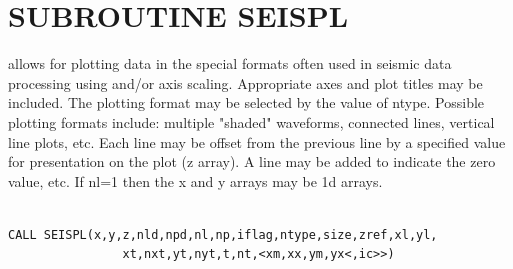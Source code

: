 \documentclass[11pt]{report}
\begin{document}
\section{SUBROUTINE SEISPL}
 allows for plotting data in the special formats often used in seismic
data processing using  and/or  axis scaling.  Appropriate
axes and plot titles may be included.  The plotting format may be
selected by the value of ntype.   Possible plotting formats include:
multiple "shaded" waveforms, connected lines, vertical line plots, etc.
Each line may be offset from the previous line by a specified value for
presentation on the plot (z array).  A line may be added to indicate
the zero value, etc.  If nl=1 then the x and y arrays 
may be 1d arrays.
\begin{verbatim}

CALL SEISPL(x,y,z,nld,npd,nl,np,iflag,ntype,size,zref,xl,yl,
                xt,nxt,yt,nyt,t,nt,<xm,xx,ym,yx<,ic>>)


\end{verbatim}
\end{document}
